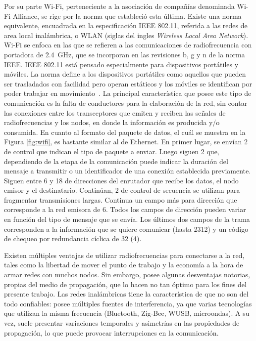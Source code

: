 Por su parte Wi-Fi, perteneciente a la asociación de compañías denominada Wi-Fi Alliance, se rige por la norma que estableció esta última. Existe una norma equivalente, encuadrada en la especificación IEEE 802.11, referida a las redes de area local inalámbrica, o WLAN (siglas del ingles {\it Wireless Local Area Network}). Wi-Fi se enfoca en las que se refieren a las comunicaciones de radiofrecuencia con portadora de \SI{2,4}{\giga\hertz}, que se incorporan en las revisiones b, g y n de la norma IEEE. IEEE 802.11 está pensado especialmente para dispositivos portátiles y móviles. La norma define a los dispositivos portátiles como aquellos que pueden ser trasladados con facilidad pero operan estáticos y los móviles se identifican por poder trabajar en movimiento~\cite{wifi2016}. La principal característica que posee este tipo de comunicación es la falta de conductores para la elaboración de la red, sin contar las conexiones entre los transceptores que emiten y reciben las señales de radiofrecuencias y los nodos, en donde la información es producida y/o consumida. En cuanto al formato del paquete de datos, el cuál se muestra en la Figura \ref{fig:wifi}, es bastante similar al de Ethernet. En primer lugar, se envían \SI{2}{\byte} de control que indican el tipo de paquete a enviar. Luego siguen \SI{2}{\byte} que, dependiendo de la etapa de la comunicación puede indicar la duración del mensaje a transmitir o un identificador de una conexión establecida previamente. Siguen entre \si{6} y \SI{18}{\byte} de direcciones del enrutador que recibe los datos, el nodo emisor y el destinatario. Continúan, \SI{2}{\byte} de control de secuencia se utilizan para fragmentar transmisiones largas. Continua un campo más para dirección que corresponde a la red emisora de \SI{6}{\byte}. Todos los campos de dirección pueden variar en función del tipo de mensaje que se envía. Los últimos dos campos de la trama corresponden a la información que se quiere comunicar (hasta \SI{2312}{\byte}) y un código de chequeo por redundancia cíclica de \SI{32}{\bit} (\SI{4}{\byte}).%

Existen múltiples ventajas de utilizar radiofrecuencias para conectarse a la red, tales como la libertad de mover el punto de trabajo y la economía a la hora de armar redes con muchos nodos. Sin embargo, posee algunas desventajas notorias, propias del medio de propagación, que lo hacen no tan óptimo para los fines del presente trabajo. Las redes inalámbricas tiene la característica de que no son del todo confiables: posee múltiples fuentes de interferencia, ya que varias tecnologías que utilizan la misma frecuencia (Bluetooth, Zig-Bee, WUSB, microondas). A su vez, suele presentar variaciones temporales y asimetrías en las propiedades de propagación, lo que puede provocar interrupciones en la comunicación.%

